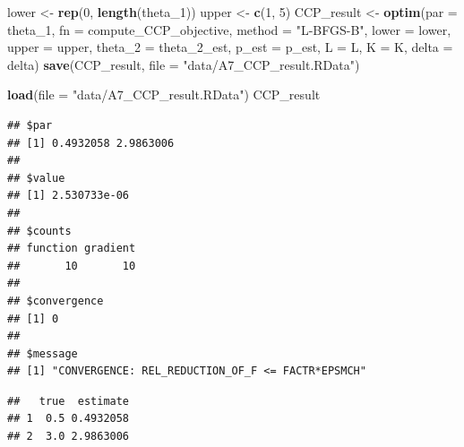 \documentclass[]{book}
\newenvironment{Shaded}{\begin{snugshade}}{\end{snugshade}}
\newcommand{\KeywordTok}[1]{\textcolor[rgb]{0.13,0.29,0.53}{\textbf{#1}}}
\newcommand{\DataTypeTok}[1]{\textcolor[rgb]{0.13,0.29,0.53}{#1}}
\newcommand{\DecValTok}[1]{\textcolor[rgb]{0.00,0.00,0.81}{#1}}
\newcommand{\StringTok}[1]{\textcolor[rgb]{0.31,0.60,0.02}{#1}}
\newcommand{\OperatorTok}[1]{\textcolor[rgb]{0.81,0.36,0.00}{\textbf{#1}}}
\newcommand{\NormalTok}[1]{#1}
\begin{document}
\begin{Shaded}
\begin{Highlighting}[]
\NormalTok{lower <-}\StringTok{ }\KeywordTok{rep}\NormalTok{(}\DecValTok{0}\NormalTok{, }\KeywordTok{length}\NormalTok{(theta_}\DecValTok{1}\NormalTok{))}
\NormalTok{upper <-}\StringTok{ }\KeywordTok{c}\NormalTok{(}\DecValTok{1}\NormalTok{, }\DecValTok{5}\NormalTok{)}
\NormalTok{CCP_result <-}
\StringTok{  }\KeywordTok{optim}\NormalTok{(}\DataTypeTok{par =}\NormalTok{ theta_}\DecValTok{1}\NormalTok{,}
        \DataTypeTok{fn =}\NormalTok{ compute_CCP_objective,}
        \DataTypeTok{method =} \StringTok{"L-BFGS-B"}\NormalTok{,}
        \DataTypeTok{lower =}\NormalTok{ lower,}
        \DataTypeTok{upper =}\NormalTok{ upper,}
        \DataTypeTok{theta_2 =}\NormalTok{ theta_2_est, }
        \DataTypeTok{p_est =}\NormalTok{ p_est, }
        \DataTypeTok{L =}\NormalTok{ L, }
        \DataTypeTok{K =}\NormalTok{ K, }
        \DataTypeTok{delta =}\NormalTok{ delta)}
\KeywordTok{save}\NormalTok{(CCP_result, }\DataTypeTok{file =} \StringTok{"data/A7_CCP_result.RData"}\NormalTok{)}
\end{Highlighting}
\end{Shaded}

\begin{Shaded}
\begin{Highlighting}[]
\KeywordTok{load}\NormalTok{(}\DataTypeTok{file =} \StringTok{"data/A7_CCP_result.RData"}\NormalTok{)}
\NormalTok{CCP_result}
\end{Highlighting}
\end{Shaded}

\begin{verbatim}
## $par
## [1] 0.4932058 2.9863006
## 
## $value
## [1] 2.530733e-06
## 
## $counts
## function gradient 
##       10       10 
## 
## $convergence
## [1] 0
## 
## $message
## [1] "CONVERGENCE: REL_REDUCTION_OF_F <= FACTR*EPSMCH"
\end{verbatim}

\begin{Shaded}
\end{Shaded}

\begin{verbatim}
##   true  estimate
## 1  0.5 0.4932058
## 2  3.0 2.9863006
\end{verbatim}
\end{document}
